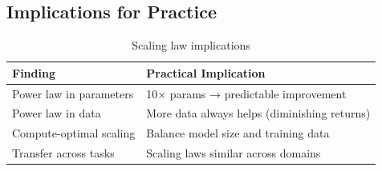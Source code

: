 \subsection{Implications for Practice}

\begin{table}[H]
\centering
\caption{Scaling law implications}
\begin{tabularx}{\textwidth}{lX}
\toprule
\textbf{Finding} & \textbf{Practical Implication} \\
\midrule
Power law in parameters & 10× params → predictable improvement \\
Power law in data & More data always helps (diminishing returns) \\
Compute-optimal scaling & Balance model size and training data \\
Transfer across tasks & Scaling laws similar across domains \\
\bottomrule
\end{tabularx}
\end{table}

